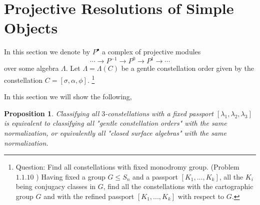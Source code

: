 \documentclass[11pt,oneside]{amsbook}
\numberwithin{equation}{section}
\theoremstyle{plain}
\newtheorem{prop}[theorem]{Proposition}
\theoremstyle{definition}
\theoremstyle{remark}
\newcommand{\sidenote}[1]{\footnote{#1}}
\begin{document}
	
	
	
	
	
	
	
	
	
	\section{Projective Resolutions of Simple Objects}
	In this section we denote by $P^{\bullet}$ a complex of projective modules
	\[ \cdots \to P^{-1} \to P^0 \to P^{1} \to \cdots \]
	over some algebra $\Lambda$. Let $\Lambda = \Lambda(C)$ be a gentle constellation order given by the constellation $C=[\sigma, \alpha, \phi]$. \sidenote{Question: Find all constellations with fixed monodromy group. 
		(Problem $1.1.10$ \cite{LZ}) Having fixed a group $G \leq  S_n$ and a passport $[K_1,...,K_k]$,
		all the $K_i$ being conjugacy classes in $G$, find all the constellations with the
		cartographic group $G$ and with the refined passport $[K_1,...,K_k]$ with respect
		to $G$.}
	
	In this section we will show the following,
	\begin{prop}\label{fixed 3-constellation to fixed normalization}
		Classifying all $3$-constellations with a fixed passport $[\lambda_1, \lambda_2, \lambda_3]$ is equivalent to classifying all "\emph{gentle constellation orders}" with the same normalization, or equivalently all "\emph{closed surface algebras}" with the same normalization. 
	\end{prop}
	
	
	
\end{document}
